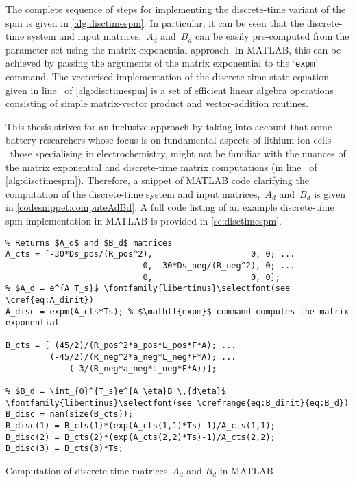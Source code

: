 The complete sequence of steps for implementing the discrete-time variant of the
\gls{spm} is given in \cref{alg:disctimespm}. In particular, it can be seen that
the  discrete-time system  and input  matrices,~$A_d$ and~$B_d$  can be  easily
pre-computed from  the parameter set  using the matrix exponential  approach. In
\textsc{MATLAB}, this  can be achieved  by passing  the arguments of  the matrix
exponential to the  `\verb+expm+' command. The vectorised  implementation of the
discrete-time  state equation  given in  line~\nolink{\ref{algLine:discstateEq}}
of  \cref{alg:disctimespm}  is a  set  of  efficient linear  algebra  operations
consisting of simple matrix-vector product and vector-addition routines.



This thesis strives  for an inclusive approach by taking  into account that some
battery researchers whose  focus is on fundamental aspects of  lithium ion cells
\eg~those  specialising in  electrochemistry,  might not  be  familiar with  the
nuances  of the  matrix exponential  and discrete-time  matrix computations  (in
line~\nolink{\ref{algLine:computeAdBd}}  of \cref{alg:disctimespm}).  Therefore,
a  snippet   of  \textsc{MATLAB}   code  clarifying   the  computation   of  the
discrete-time   system   and   input   matrices,~$A_d$   and~$B_d$   is   given
in   \cref{codesnippet:computeAdBd}.  A   full  code   listing  of   an  example
discrete-time  \gls{spm}  implementation  in   \textsc{MATLAB}  is  provided  in
\cref{sc:disctimespm}.

\begin{listing}[!htbp]
\begin{verbatim}
% Returns $A_d$ and $B_d$ matrices
A_cts = [-30*Ds_pos/(R_pos^2),                    0, 0; ...
                            0, -30*Ds_neg/(R_neg^2), 0; ...
                            0,                    0, 0];
% $A_d = e^{A T_s}$ \fontfamily{libertinus}\selectfont(see \cref{eq:A_dinit})
A_disc = expm(A_cts*Ts); % $\mathtt{expm}$ command computes the matrix exponential

B_cts = [ (45/2)/(R_pos^2*a_pos*L_pos*F*A); ...
         (-45/2)/(R_neg^2*a_neg*L_neg*F*A); ...
             (-3/(R_neg*a_neg*L_neg*F*A))];

% $B_d = \int_{0}^{T_s}e^{A \eta}B \,{d\eta}$ \fontfamily{libertinus}\selectfont(see \crefrange{eq:B_dinit}{eq:B_d})
B_disc = nan(size(B_cts));
B_disc(1) = B_cts(1)*(exp(A_cts(1,1)*Ts)-1)/A_cts(1,1);
B_disc(2) = B_cts(2)*(exp(A_cts(2,2)*Ts)-1)/A_cts(2,2);
B_disc(3) = B_cts(3)*Ts;
\end{verbatim}
\caption{Computation of discrete-time matrices~$A_d$ and $B_d$ in
\textsc{MATLAB}}
\label{codesnippet:computeAdBd}
\end{listing}


